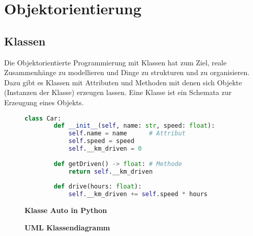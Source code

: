 \section{Objektorientierung}
\subsection{Klassen}

Die Objektorientierte Programmierung mit Klassen hat zum Ziel,
reale Zusammenhänge zu modellieren und Dinge zu strukturen und
zu organisieren. Dazu gibt es Klassen mit Attributen und Methoden
mit denen sich Objekte (Instanzen der Klasse) erzeugen lassen.
Eine Klasse ist ein Schemata zur Erzeugung eines Objekts.


\vspace*{0.5cm}
\begin{figure}[H]
\begin{center}
\hspace*{-2cm}
\begin{minipage}{.7\textwidth}
    \begin{lstlisting}[language=python]
    class Car:
        def __init__(self, name: str, speed: float):
            self.name = name      # Attribut
            self.speed = speed
            self.__km_driven = 0
            
        def getDriven() -> float: # Methode
            return self.__km_driven
            
        def drive(hours: float):
            self.__km_driven += self.speed * hours
    \end{lstlisting}
    \caption{\textbf{Klasse Auto in Python}}
\end{minipage}
\begin{minipage}{.3\textwidth}
    \caption{\textbf{UML Klassendiagramm}}
\end{minipage}
\end{center}
\end{figure}

